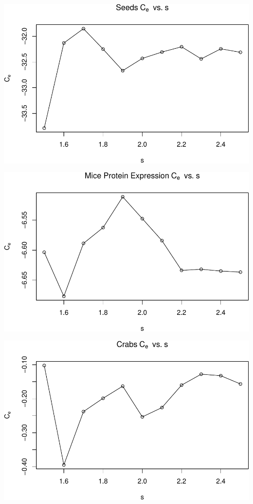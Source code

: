 \documentclass[]{article}
\begin{document}
\begin{center}\includegraphics[width=1\linewidth]{Report_files/figure-latex/unnamed-chunk-24-5} \end{center}

\begin{center}\includegraphics[width=1\linewidth]{Report_files/figure-latex/unnamed-chunk-24-6} \end{center}

\begin{center}\includegraphics[width=1\linewidth]{Report_files/figure-latex/unnamed-chunk-24-7} \end{center}
\end{document}
